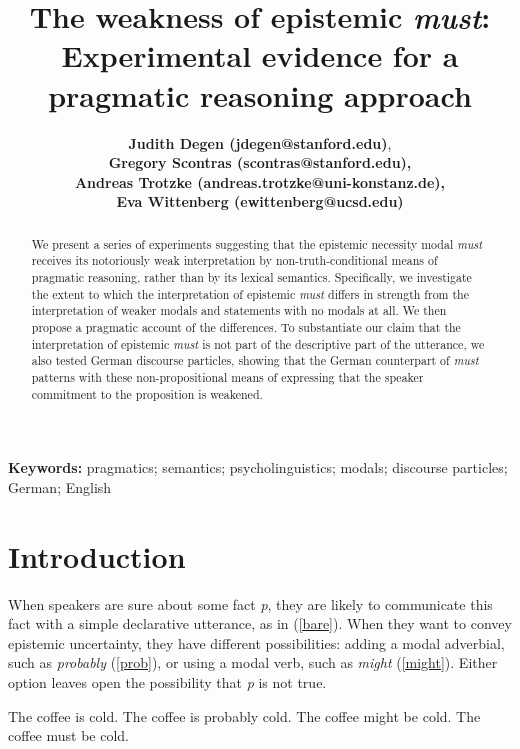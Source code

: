 \documentclass[11pt]{article}
\title{The weakness of epistemic \emph{must}: Experimental evidence for a pragmatic reasoning approach}
\author{{\large \bf Judith Degen (jdegen@stanford.edu)}, \\ {\large \bf Gregory Scontras (scontras@stanford.edu),}\\ {\large \bf Andreas Trotzke (andreas.trotzke@uni-konstanz.de),}\\ {\large \bf Eva Wittenberg (ewittenberg@ucsd.edu)}}
\begin{document}
\maketitle

\begin{abstract}

We present a series of experiments suggesting that the epistemic necessity modal \emph{must} receives its notoriously weak interpretation by non-truth-conditional means of pragmatic reasoning, rather than by its lexical semantics. Specifically, we investigate the extent to which the interpretation of epistemic \emph{must} differs in strength from the interpretation of weaker modals and statements with no modals at all. We then propose a pragmatic account of the differences. To substantiate our claim that the interpretation of epistemic \emph{must} is not part of the descriptive part of the utterance, we also tested German discourse particles, showing that the German counterpart of \emph{must} patterns with these non-propositional means of expressing that the speaker commitment to the proposition is weakened.	
\end{abstract}

\textbf{Keywords:} 
pragmatics; semantics; psycholinguistics; modals; discourse particles; German; English


\section{Introduction}

When speakers are sure about some fact \emph{p}, they are likely to communicate this fact with a simple declarative utterance, as in (\ref{bare}). When they want to convey epistemic uncertainty, they have different possibilities: adding a modal adverbial, such as \emph{probably} (\ref{prob}), or using a modal verb, such as \emph{might} (\ref{might}). Either option leaves open the possibility that \emph{p} is not true.

\begin{exe}
	\ex\label{english} \begin{xlist}
		\ex\label{bare} The coffee is cold.
		\ex\label{prob} The coffee is probably cold.
		\ex\label{might} The coffee might be cold.
		\ex\label{must} The coffee must be cold.
	\end{xlist}
\end{exe}
\end{document}
